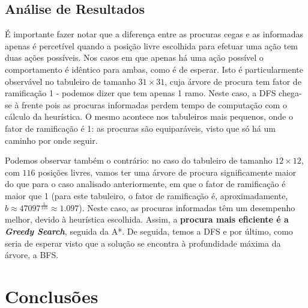 \documentclass[12pt,a4paper]{article}
\begin{document}
\subsection{Análise de Resultados}

É importante fazer notar que a diferença entre as procuras cegas e as informadas
apenas é percetível quando a posição livre escolhida para efetuar uma ação tem duas ações possíveis.
Nos casos em que apenas há uma ação possível o comportamento é idêntico para ambas, como é de esperar.
Isto é particularmente observável no tabuleiro de tamanho \(31 \times 31\), cuja árvore de procura tem fator de ramificação 1 -
podemos dizer que tem apenas 1 ramo. Neste caso, a DFS chega-se à frente pois as procuras informadas perdem
tempo de computação com o cálculo da heurística.
O mesmo acontece nos tabuleiros mais pequenos, onde o fator de ramificação é 1:
as procuras são equiparáveis, visto que só há um caminho por onde seguir.

Podemos observar também o contrário: no caso do tabuleiro de tamanho \(12 \times 12\), com \(116\) posições
livres, vamos ter uma árvore de procura significamente maior do que para o caso analisado anteriormente,
em que o fator de ramificação é maior que 1 (para este tabuleiro, o fator de ramificação é,
aproximadamente, \(b \approx 47097^{\frac{1}{116}} \approx 1.097\)).
Neste caso, as procuras informadas têm um desempenho melhor, devido à heurística escolhida.
Assim, a \textbf{procura mais eficiente é a \textit{Greedy Search}}, seguida da A*.
De seguida, temos a DFS e por último, como seria de esperar visto que a solução se encontra
à profundidade máxima da árvore, a BFS.

\section{Conclusões}
\end{document}
